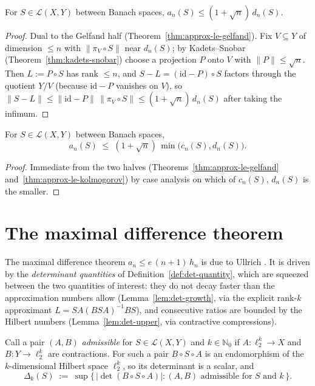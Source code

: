 \begin{theorem}
\label{thm:approx-le-kolmogorov}
\leanok
{}
For $S \in \mathcal{L}(X, Y)$ between Banach spaces,
$a_n(S) \le (1 + \sqrt{n})\,d_n(S)$.
\end{theorem}
\begin{proof}
\leanok
{}
Dual to the Gelfand half (Theorem~\ref{thm:approx-le-gelfand}). Fix
$V \subseteq Y$ of dimension $\le n$ with
$\|\pi_V \circ S\|$ near $d_n(S)$; by Kadets--Snobar
(Theorem~\ref{thm:kadets-snobar}) choose a projection $P$ onto $V$ with
$\|P\| \le \sqrt n$. Then $L := P \circ S$ has rank $\le n$, and
$S - L = (\mathrm{id} - P) \circ S$ factors through the quotient $Y / V$
(because $\mathrm{id} - P$ vanishes on $V$), so
$\|S - L\| \le \|\mathrm{id} - P\|\,\|\pi_V \circ S\| \le (1+\sqrt n)\,d_n(S)$
after taking the infimum.
\end{proof}

\begin{theorem}
\label{thm:approx-le-min}
\leanok
For $S \in \mathcal{L}(X, Y)$ between Banach spaces,
\[
  a_n(S) \;\le\; (1 + \sqrt{n})\,\min\bigl(c_n(S), d_n(S)\bigr).
\]
\end{theorem}
\begin{proof}
\leanok
{}
Immediate from the two halves (Theorems~\ref{thm:approx-le-gelfand}
and~\ref{thm:approx-le-kolmogorov}) by case analysis on which of $c_n(S)$,
$d_n(S)$ is the smaller.
\end{proof}

\section{The maximal difference theorem}
\label{sec:ineq-maxdiff}

The maximal difference theorem $a_n \le e\,(n+1)\, h_n$ is due to Ullrich
\cite{U26}. It is driven by the \emph{determinant quantities} of
Definition~\ref{def:det-quantity}, which are squeezed between the two
quantities of interest: they do not decay faster than the approximation numbers
allow (Lemma~\ref{lem:det-growth}, via the explicit rank-$k$ approximant
$L = SA(BSA)^{-1}BS$), and consecutive ratios are bounded by the Hilbert
numbers (Lemma~\ref{lem:det-upper}, via contractive compressions).

\begin{definition}
\label{def:det-quantity}
\leanok
Call a pair $(A, B)$ \emph{admissible} for $S \in \mathcal{L}(X, Y)$ and
$k \in \mathbb{N}_0$ if $A : \ell_2^k \to X$ and $B : Y \to \ell_2^k$ are
contractions. For such a pair $B \circ S \circ A$ is an endomorphism of the
$k$-dimensional Hilbert space $\ell_2^k$, so its determinant is a scalar, and
\[
  \Delta_k(S) \;:=\; \sup\bigl\{\, |\det(B \circ S \circ A)| :
    (A, B) \text{ admissible for } S \text{ and } k \,\bigr\} .
\]
\end{definition}


